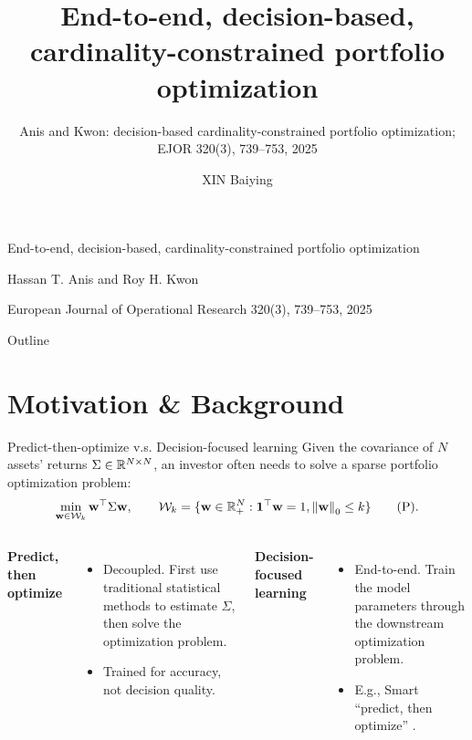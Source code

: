\documentclass[10pt,aspectratio=169]{beamer}
\title{End-to-end, decision-based, cardinality-constrained portfolio optimization}
\subtitle{Anis and Kwon: decision-based cardinality-constrained portfolio optimization; EJOR 320(3), 739--753, 2025}
\author{XIN Baiying}
\institute{SJTU}
\date{}
\newcommand{\Kcard}{k}
\newcommand{\Wset}{\mathcal{W}}
\newcommand{\SigmaMat}{\Sigma}
\begin{document}
\begin{frame}[plain]
  \vfill
  {\LARGE
  End-to-end, decision-based, cardinality-constrained portfolio optimization\par}
  \vspace{.6em}
  {\normalsize Hassan T. Anis and Roy H. Kwon\par}
  {\normalsize European Journal of Operational Research 320(3), 739--753, 2025\par}
  \vspace{1.2em}
  \vfill
\end{frame}

\begin{frame}{Outline}
  \tableofcontents
\end{frame}

\section{Motivation \& Background}

\begin{frame}{Predict-then-optimize v.s. Decision-focused learning}
  Given the covariance of $N$ assets' returns $\SigmaMat \in \RR^{N\times N}$, an investor often needs to solve a sparse portfolio optimization problem:
  \[ 
    \min_{\mathbf{w}\in\Wset_\Kcard} \mathbf{w}^\top \SigmaMat \mathbf{w},
    \qquad
    \Wset_\Kcard = \{\mathbf{w}\in\RR_+^N : \one^\top \mathbf{w}=1, \norm{\mathbf{w}}_0 \le k\} \tag{P}.
  \]

  \begin{columns}[T,onlytextwidth]
    \textbf{Predict, then optimize}
    \begin{itemize}
      \item Decoupled. First use traditional statistical methods to estimate $\SigmaMat$, then solve the optimization problem.
      \item Trained for accuracy, not decision quality.
    \end{itemize}

    \textbf{Decision-focused learning}
    \begin{itemize}
      \item End-to-end. Train the model parameters through the downstream optimization problem.
      \item E.g., Smart ``predict, then optimize'' \parencite{ElmachtoubGrigas2021SPO}.
    \end{itemize}
  \end{columns}

\end{frame}
\end{document}
